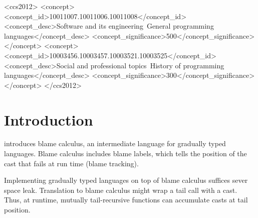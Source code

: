 \documentclass[acmsmall,review,anonymous]{acmart}\settopmatter{printfolios=true,printccs=false,printacmref=false}
\begin{document}
\begin{CCSXML}
<ccs2012>
<concept>
<concept_id>10011007.10011006.10011008</concept_id>
<concept_desc>Software and its engineering~General programming languages</concept_desc>
<concept_significance>500</concept_significance>
</concept>
<concept>
<concept_id>10003456.10003457.10003521.10003525</concept_id>
<concept_desc>Social and professional topics~History of programming languages</concept_desc>
<concept_significance>300</concept_significance>
</concept>
</ccs2012>
\end{CCSXML}





\maketitle


\section{Introduction}


\citet{wadler2009well} introduces blame calculus, an intermediate language for 
gradually typed languages. Blame calculus includes blame labels, which tells 
the position of the cast that fails at run time (blame tracking).

Implementing gradually typed languages on top of blame calculus suffices sever 
space leak. Translation to blame calculus might wrap a tail call with a 
cast. Thus, at runtime, mutually tail-recursive functions can accumulate casts 
at tail position.
\end{document}
